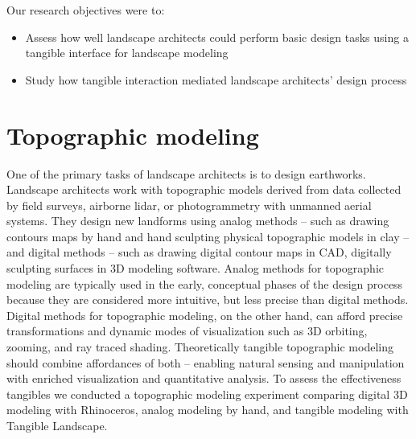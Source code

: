 \documentclass[Afour,sagev,times]{sagej} %
\begin{document}
Our research objectives were to:
%
\begin{itemize}
\item Assess how well landscape architects could perform 
basic design tasks using a tangible interface for landscape modeling
\item Study how tangible interaction mediated
landscape architects' design process
\end{itemize}


\section{Topographic modeling}
%
One of the primary tasks of landscape architects is to design earthworks.
\cite{Petschek2008,Strom2013}
Landscape architects work with topographic models 
derived from data collected by field surveys, airborne lidar, 
or photogrammetry with unmanned aerial systems.
They design new landforms 
using analog methods -- such as 
drawing contours maps by hand and
hand sculpting physical topographic models in clay --
and digital methods -- such as 
drawing digital contour maps in CAD,
digitally sculpting surfaces in 3D modeling software. 
Analog methods for topographic modeling are typically used 
in the early, conceptual phases of the design process because 
they are considered more intuitive, but less precise than digital methods.
Digital methods for topographic modeling, on the other hand, 
can afford precise transformations and
dynamic modes of visualization such as 
3D orbiting, zooming, and ray traced shading.
Theoretically tangible topographic modeling 
should combine affordances of both -- 
enabling natural sensing and manipulation
with enriched visualization and quantitative analysis.
To assess the effectiveness tangibles
we conducted a topographic modeling experiment
comparing 
digital 3D modeling with Rhinoceros, 
analog modeling by hand, 
and tangible modeling with Tangible Landscape. 
\end{document}
